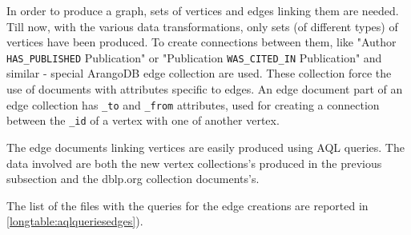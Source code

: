 In order to produce a graph, sets of vertices and edges linking them are needed.
Till now, with the various data transformations, only sets (of different types) of vertices have been produced.
To create connections between them, like "Author \texttt{HAS\_PUBLISHED} Publication" or "Publication \texttt{WAS\_CITED\_IN} Publication" and similar - special ArangoDB edge collection are used.
These collection force the use of documents with attributes specific to edges.
An edge document part of an edge collection has \texttt{\_to} and \texttt{\_from} attributes, used for creating a connection between the \texttt{\_id} of a vertex with one of another vertex.

The edge documents linking vertices are easily produced using \acrshort{AQL} queries.
The data involved are both the new vertex collections's produced in the previous subsection and the \gls{dblp.org} collection documents's.
\medskip

The list of the files with the queries for the edge creations are reported in \hyperref[longtable:aqlqueriesedges]{\autoref{longtable:aqlqueriesedges}}).


